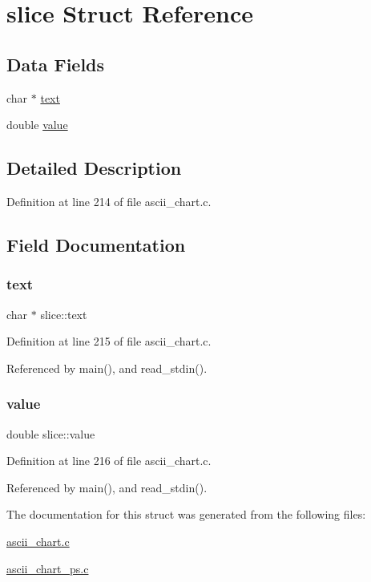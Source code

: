 \hypertarget{structslice}{}\section{slice Struct Reference}
\label{structslice}
\subsection*{Data Fields}
\begin{DoxyCompactItemize}
\item 
char $\ast$ \hyperlink{structslice_ad9d114e9a70bbba4df5637d9fe91af21}{text}
\item 
double \hyperlink{structslice_a82d7890eda71b3697130c625083031fc}{value}
\end{DoxyCompactItemize}


\subsection{Detailed Description}


Definition at line 214 of file ascii\+\_\+chart.\+c.



\subsection{Field Documentation}
\mbox{\label{structslice_ad9d114e9a70bbba4df5637d9fe91af21}} 
\subsubsection{\texorpdfstring{text}{text}}
{\footnotesize\ttfamily char $\ast$ slice\+::text}



Definition at line 215 of file ascii\+\_\+chart.\+c.



Referenced by main(), and read\+\_\+stdin().

\mbox{\label{structslice_a82d7890eda71b3697130c625083031fc}} 
\subsubsection{\texorpdfstring{value}{value}}
{\footnotesize\ttfamily double slice\+::value}



Definition at line 216 of file ascii\+\_\+chart.\+c.



Referenced by main(), and read\+\_\+stdin().



The documentation for this struct was generated from the following files\+:\begin{DoxyCompactItemize}
\item 
\hyperlink{ascii__chart_8c}{ascii\+\_\+chart.\+c}\item 
\hyperlink{ascii__chart__ps_8c}{ascii\+\_\+chart\+\_\+ps.\+c}\end{DoxyCompactItemize}
